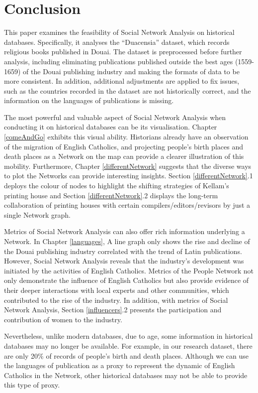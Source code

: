 \documentclass[12pt,a4paper,oneside]{book}
\begin{document}
\begin{sloppypar}
\chapter{Conclusion}
\label{conclusion}
This paper examines the feasibility of Social Network Analysis on historical databases. Specifically, it analyses the “Duacensia” dataset, which records religious books published in Douai. The dataset is preprocessed before further analysis, including eliminating publications published outside the best ages (1559-1659) of the Douai publishing industry and making the formats of data to be more consistent. In addition, additional adjustments are applied to fix issues, such as the countries recorded in the dataset are not historically correct, and the information on the languages of publications is missing.

The most powerful and valuable aspect of Social Network Analysis when conducting it on historical databases can be its visualisation. Chapter \ref{comeAndGo} exhibits this visual ability. Historians already have an observation of the migration of English Catholics, and projecting people’s birth places and death places as a Network on the map can provide a clearer illustration of this mobility. Furthermore, Chapter \ref{differentNetwork} suggests that the diverse ways to plot the Networks can provide interesting insights. Section \ref{differentNetwork}.1 deploys the colour of nodes to highlight the shifting strategies of Kellam’s printing house and Section \ref{differentNetwork}.2 displays the long-term collaboration of printing houses with certain compilers/editors/revisors by just a single Network graph.

Metrics of Social Network Analysis can also offer rich information underlying a Network. In Chapter \ref{languages}, A line graph only shows the rise and decline of the Douai publishing industry correlated with the trend of Latin publications. However, Social Network Analysis reveals that the industry's development was initiated by the activities of English Catholics. Metrics of the People Network not only demonstrate the influence of English Catholics but also provide evidence of their deeper interactions with local experts and other communities, which contributed to the rise of the industry. In addition, with metrics of Social Network Analysis, Section \ref{influencers}.2 presents the participation and contribution of women to the industry.

Nevertheless, unlike modern databases, due to age, some information in historical databases may no longer be available. For example, in our research dataset, there are only 20\% of records of people’s birth and death places. Although we can use the languages of publication as a proxy to represent the dynamic of English Catholics in the Network, other historical databases may not be able to provide this type of proxy.


\end{sloppypar}
\end{document}
